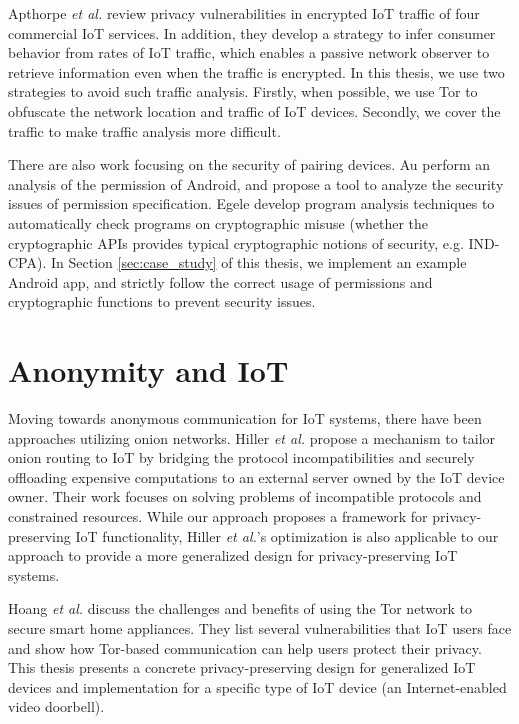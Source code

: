 Apthorpe \textit{et al.} \cite{apthorpe2017smart} review privacy vulnerabilities in encrypted IoT traffic of four commercial IoT services. In addition, they develop a strategy to infer consumer behavior from rates of IoT traffic, which enables a passive network observer to retrieve information even when the traffic is encrypted. In this thesis, we use two strategies to avoid such traffic analysis. Firstly, when possible, we use Tor to obfuscate the network location and traffic of IoT devices. Secondly, we cover the traffic to make traffic analysis more difficult.

There are also work focusing on the security of pairing devices. Au \cite{au2012pscout} perform an analysis of the permission of Android, and propose a tool to analyze the security issues of permission specification. Egele \cite{egele2013empirical} develop program analysis techniques to automatically check programs on cryptographic misuse (whether the cryptographic APIs provides typical cryptographic notions of security, e.g. IND-CPA). In Section \ref{sec:case_study} of this thesis, we implement an example Android app, and strictly follow the correct usage of permissions and cryptographic functions to prevent security issues.



\section{Anonymity and IoT}

Moving towards anonymous communication for IoT systems, there have been approaches utilizing onion networks. Hiller \textit{et al.} \cite{hiller2019tailoring} propose a mechanism to tailor onion routing to IoT by bridging the protocol incompatibilities and securely offloading expensive computations to an external server owned by the IoT device owner. Their work focuses on solving problems of incompatible protocols and constrained resources. While our approach proposes a framework for privacy-preserving IoT functionality, Hiller \textit{et al.}'s optimization is also applicable to our approach to provide a more generalized design for privacy-preserving IoT systems.

Hoang \textit{et al.} \cite{hoang2015tor} discuss the challenges and benefits of using the Tor network to secure smart home appliances. They list several  vulnerabilities that IoT users face and show how Tor-based communication can help users protect their privacy. This thesis presents a concrete privacy-preserving design for generalized IoT devices and implementation for a specific type of IoT device (an Internet-enabled video doorbell).

